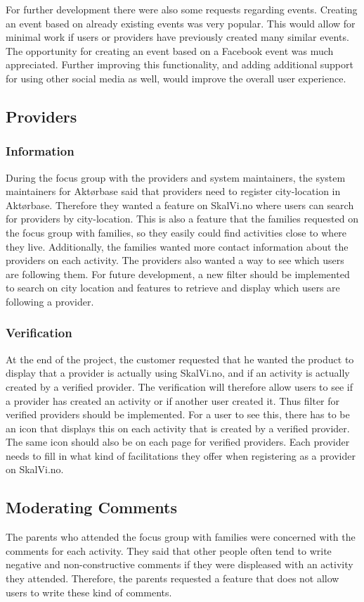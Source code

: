 For further development there were also some requests regarding events. Creating an event based on already existing events was very popular. This would allow for minimal work if users or providers have previously created many similar events. The opportunity for creating an event based on a Facebook event was much appreciated. Further improving this functionality, and adding additional support for using other social media as well, would improve the overall user experience.

\subsection{Providers}
\subsubsection{Information}
During the focus group with the providers and system maintainers, the system maintainers for Aktørbase said that providers need to register city-location in Aktørbase. Therefore they wanted a feature on SkalVi.no where users can search for providers by city-location. This is also a feature that the families requested on the focus group with families, so they easily could find activities close to where they live. Additionally, the families wanted more contact information about the providers on each activity. The providers also wanted a way to see which users are following them. For future development, a new filter should be implemented to search on city location and features to retrieve and display which users are following a provider.

\subsubsection{Verification}
At the end of the project, the customer requested that he wanted the product to display that a provider is actually using SkalVi.no, and if an activity is actually created by a verified provider. The verification will therefore allow users to see if a provider has created an activity or if another user created it. Thus filter for verified providers should be implemented. For a user to see this, there has to be an icon that displays this on each activity that is created by a verified provider. The same icon should also be on each page for verified providers. Each provider needs to fill in what kind of facilitations they offer when registering as a provider on SkalVi.no. 


\subsection{Moderating Comments}
The parents who attended the focus group with families were concerned with the comments for each activity. They said that other people often tend to write negative and non-constructive comments if they were displeased with an activity they attended. Therefore, the parents requested a feature that does not allow users to write these kind of comments. 

